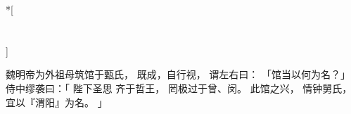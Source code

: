 
\switchcolumn[0]*[\section{}]

魏明帝为外祖母筑馆于甄氏，
既成，自行视，
谓左右曰：
「馆当以何为名？」
侍中缪袭曰：「
    陛下圣思
    齐于哲王，
    罔极过于曾、闵。
    此馆之兴，
    情钟舅氏，
    宜以『渭阳』为名。
」

\switchcolumn



